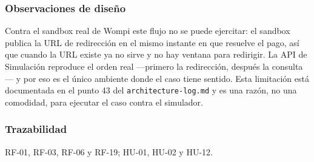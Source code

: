 \subsubsection{Observaciones de diseño}

Contra el sandbox real de Wompi este flujo no se puede ejercitar: el sandbox publica la URL de redirección en el mismo instante en que resuelve el pago, así que cuando la URL existe ya no sirve y no hay ventana para redirigir. La API de Simulación reproduce el orden real —primero la redirección, después la consulta— y por eso es el único ambiente donde el caso tiene sentido. Esta limitación está documentada en el punto 43 del \texttt{architecture-log.md} y es una razón, no una comodidad, para ejecutar el caso contra el simulador.

\subsubsection{Trazabilidad}

RF-01, RF-03, RF-06 y RF-19; HU-01, HU-02 y HU-12.
